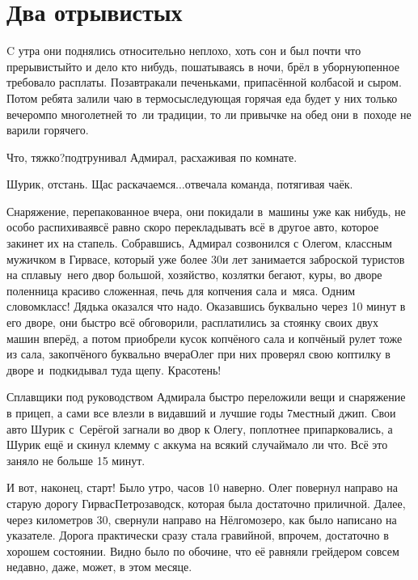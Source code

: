 \chapter{Два отрывистых}
\vepsianrose

C утра они поднялись относительно неплохо, хоть сон и был почти что прерывистый\mdash то и дело кто нибудь, пошатываясь в ночи, брёл в уборную\mdash пенное требовало расплаты. Позавтракали печеньками, припасённой колбасой и сыром. Потом ребята залили чаю в термосы\mdash следующая горячая еда будет у них только вечером\mdash по многолетней то~ли традиции, то ли привычке на обед они в~походе не варили горячего.

\diagdash Что, тяжко?\mdash подтрунивал Адмирал, расхаживая по комнате.

\diagdash Шурик, отстань. Щас раскачаемся$\ldots$\mdash отвечала команда, потягивая чаёк.

Снаряжение, перепакованное вчера, они покидали в~машины уже как нибудь, не особо распихивая\mdash всё равно скоро перекладывать всё в другое авто, которое закинет их на стапель. Собравшись, Адмирал созвонился с Олегом, классным мужичком в Гирвасе, который уже более 30\sdash и лет занимается заброской туристов на сплавы\mdash у~него двор большой, хозяйство, козлятки бегают, куры, во дворе поленница красиво сложенная, печь для копчения сала и~мяса. Одним словом\mdash класс! Дядька оказался что надо. Оказавшись буквально через 10 минут в его дворе, они быстро всё обговорили, расплатились за стоянку своих двух машин вперёд, а потом приобрели кусок копчёного сала и копчёный рулет тоже из сала, закопчёного буквально вчера\mdash Олег при них проверял свою коптилку в дворе и~подкидывал туда щепу. Кра\sdash со\sdash тень! 

Сплавщики под руководством Адмирала быстро переложили вещи и снаряжение в прицеп, а сами все влезли в видавший и лучшие годы 7\sdash местный джип. Свои авто Шурик с~Серёгой загнали во двор к Олегу, поплотнее припарковались, а Шурик ещё и скинул клемму с аккума на всякий случай\mdash мало ли что. Всё это заняло не больше 15 минут.

И вот, наконец, старт! Было утро, часов 10 наверно. Олег повернул направо на старую дорогу Гирвас\mdash Петрозаводск, которая была достаточно приличной. Далее, через километров 30, свернули направо на Нёлгомозеро, как было написано на указателе. Дорога практически сразу стала гравийной, впрочем, достаточно в хорошем состоянии. Видно было по обочине, что её равняли грейдером совсем недавно, даже, может, в этом месяце.

